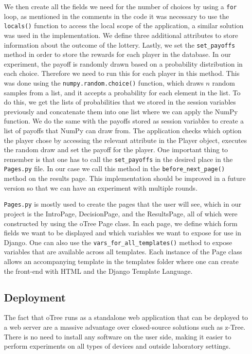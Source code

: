 \documentclass [12pt,a4paper,oneside]{article}
\begin{document}
We then create all the fields we need for the number of choices by using a \texttt{for} loop, as mentioned in the comments in the code it was necessary to use the \texttt{locals()} function to access the local scope of the application, a similar solution was used in the \cite{holzmeister_otree_2017} implementation. We define three additional attributes to store information about the outcome of the lottery. Lastly, we set the \texttt{set_payoffs} method in order to store the rewards for each player in the database. In our experiment, the payoff is randomly drawn based on a probability distribution in each choice. Therefore we need to run this for each player in this method. This was done using the \texttt{numpy.random.choice()} function, which draws $n$ random samples from a list, and it accepts a probability for each element in the list. To do this, we get the lists of probabilities that we stored in the session variables previously and concatenate them into one list where we can apply the NumPy function. We do the same with the payoffs stored as session variables to create a list of payoffs that NumPy can draw from. The application checks which option the player chose by accessing the relevant attribute in the Player object, executes the random draw and set the payoff for the player. One important thing to remember is that one has to call the \texttt{set_payoffs} in the desired place in the \texttt{Pages.py} file. In our case we call this method in the \texttt{before_next_page()} method on the results page. This implementation should be improved in a future version so that we can have an experiment with multiple rounds. 

\texttt{Pages.py} is mostly used to create the pages that the user will see, which in our project is the IntroPage, DecisionPage, and the ResultsPage, all of which were constructed by using the oTree Page class. In each page, we define which form fields we want to be displayed and which variables we want to expose for use in Django. One can also use the \texttt{vars_for_all_templates()} method to expose variables that are available across all templates. Each instance of the Page class allows an accompanying template in the templates folder where one can create the front-end with HTML and the Django Template Language. 


\subsection{Deployment}
The fact that oTree runs as a standalone web application that can be deployed to a web server are a massive advantage over closed-source solutions such as z-Tree. There is no need to install any software on the user side, making it easier to perform experiments on all types of devices and outside laboratory settings. 
\end{document}
